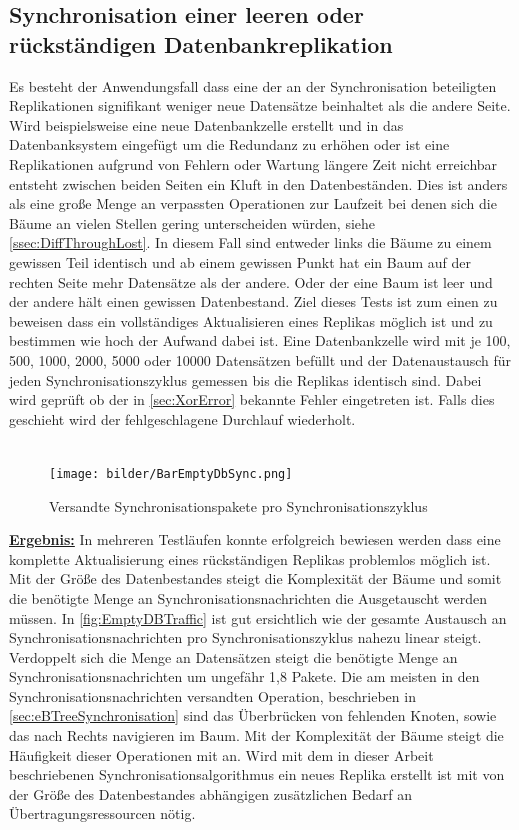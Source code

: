 \documentclass[a4paper,11pt,oneside,%
headsepline,												%
footsepline,												%
bibtotocnumbered									%
]{scrreprt}
\begin{document}
\subsection{Synchronisation einer leeren oder rückständigen Datenbankreplikation}
\label{ssec:EmptyDBTest}
Es besteht der Anwendungsfall dass eine der an der Synchronisation beteiligten Replikationen signifikant weniger neue Datensätze beinhaltet als die andere Seite. Wird beispielsweise eine neue Datenbankzelle erstellt und in das Datenbanksystem eingefügt um die Redundanz zu erhöhen oder ist eine Replikationen aufgrund von Fehlern oder Wartung längere Zeit nicht erreichbar entsteht zwischen beiden Seiten ein Kluft in den Datenbeständen. Dies ist anders als eine große Menge an verpassten Operationen zur Laufzeit bei denen sich die Bäume an vielen Stellen gering unterscheiden würden, siehe \autoref{ssec:DiffThroughLost}. In diesem Fall sind entweder links die Bäume zu einem gewissen Teil identisch und ab einem gewissen Punkt hat ein Baum auf der rechten Seite mehr Datensätze als der andere. Oder der eine Baum ist leer und der andere hält einen gewissen Datenbestand. Ziel dieses Tests ist zum einen zu beweisen dass ein vollständiges Aktualisieren eines Replikas möglich ist und zu bestimmen wie hoch der Aufwand dabei ist. Eine Datenbankzelle wird mit je 100, 500, 1000, 2000, 5000 oder 10000 Datensätzen befüllt und der Datenaustausch für jeden Synchronisationszyklus gemessen bis die Replikas identisch sind. Dabei wird geprüft ob der in \autoref{sec:XorError} bekannte Fehler eingetreten ist. Falls dies geschieht wird der fehlgeschlagene Durchlauf  wiederholt.\\\\
\begin{figure}
  \begin{center}
    \texttt{[image: bilder/BarEmptyDbSync.png]}
  \end{center}
 \caption{Versandte Synchronisationspakete pro Synchronisationszyklus}
  \label{fig:EmptyDBTraffic}
\end{figure}
\underline{{\bf Ergebnis:}} In mehreren Testläufen konnte erfolgreich bewiesen werden dass eine komplette Aktualisierung eines rückständigen Replikas problemlos möglich ist. Mit der Größe des Datenbestandes steigt die Komplexität der Bäume und somit die benötigte Menge an Synchronisationsnachrichten die Ausgetauscht werden müssen. In \autoref{fig:EmptyDBTraffic} ist gut ersichtlich wie der gesamte Austausch an Synchronisationsnachrichten pro Synchronisationszyklus nahezu linear steigt. Verdoppelt sich die Menge an Datensätzen steigt die benötigte Menge an Synchronisationsnachrichten um ungefähr 1,8 Pakete. Die am meisten in den Synchronisationsnachrichten versandten Operation, beschrieben in \autoref{sec:eBTreeSynchronisation} sind das Überbrücken von fehlenden Knoten, sowie das nach Rechts navigieren im Baum. Mit der Komplexität der Bäume steigt die Häufigkeit dieser Operationen mit an. Wird mit dem in dieser Arbeit beschriebenen Synchronisationsalgorithmus ein neues Replika erstellt ist mit von der Größe des Datenbestandes abhängigen zusätzlichen Bedarf an Übertragungsressourcen nötig.
\end{document}
